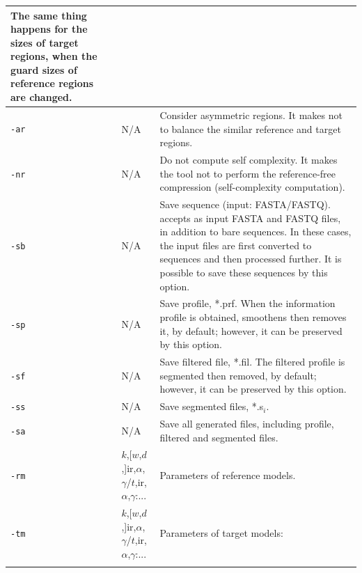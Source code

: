 \documentclass[a4paper,9pt]{extarticle}
\newcommand*{\mono}[1]{\lstinline|#1|}
\newcommand*{\method}[1]{\text{#1}\xspace}
\newcommand*{\smashpp}   {\method{Smash++}}
\newcommand*{\fasta}     {FASTA\xspace}
\newcommand*{\fastq}     {FASTQ\xspace}
\begin{document}
\begin{small}
\begin{tabularx}{\linewidth}{@{}lp{2.9cm}X@{}}
  The same thing happens for the sizes of target regions, when the guard sizes of reference regions are changed. \\
  \midrule
  \mono{-ar} & N/A & Consider asymmetric regions. It makes \smashpp not to balance the similar reference and target regions. \\
  \midrule
  \mono{-nr} & N/A & Do not compute self complexity. It makes the tool not to perform the reference-free compression (self-complexity computation). \\
  \midrule
  \mono{-sb} & N/A & Save sequence (input: FASTA/FASTQ). \smashpp accepts as input \fasta and \fastq files, in addition to bare sequences. In these cases, the input files are first converted to sequences and then processed further. It is possible to save these sequences by this option. \\
  \midrule
  \mono{-sp} & N/A & Save profile, *.prf. When the information profile is obtained, \smashpp smoothens then removes it, by default; however, it can be preserved by this option. \\
  \midrule
  \mono{-sf} & N/A & Save filtered file, *.fil. The filtered profile is segmented then removed, by default; however, it can be preserved by this option. \\
  \midrule
  \mono{-ss} & N/A & Save segmented files, *.s$_i$. \\
  \midrule
  \mono{-sa} & N/A & Save all generated files, including profile, filtered and segmented files. \\
  \midrule
  \mono{-rm} & $k$,[$w$,$d$,]ir,$\alpha$,$\gamma$/$t$,ir,$\alpha$,$\gamma$:... & Parameters of reference models. \\
  \mono{-tm} & $k$,[$w$,$d$,]ir,$\alpha$,$\gamma$/$t$,ir,$\alpha$,$\gamma$:... & Parameters of target models: \\
& {}\newline{}{\scalebox{0.75}{$14,0,0.001,0.95/5,0,0.001,0.95$}}

\end{tabularx}
\end{small}
\end{document}
